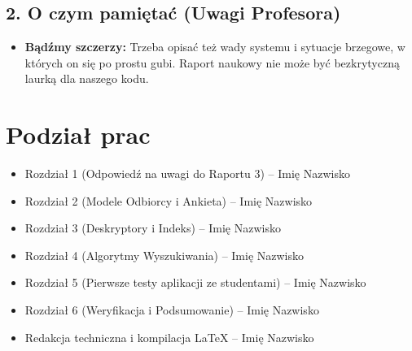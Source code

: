 \documentclass[14pt,a4paper]{extarticle}
\begin{document}
\subsection*{2. O czym pamiętać (Uwagi Profesora)}
\begin{itemize}
    \item \textbf{Bądźmy szczerzy:} Trzeba opisać też wady systemu i sytuacje brzegowe, w których on się po prostu gubi. Raport naukowy nie może być bezkrytyczną laurką dla naszego kodu.
\end{itemize}

\section*{Podział prac}
\begin{itemize}
    \item Rozdział 1 (Odpowiedź na uwagi do Raportu 3) -- Imię Nazwisko
    \item Rozdział 2 (Modele Odbiorcy i Ankieta) -- Imię Nazwisko
    \item Rozdział 3 (Deskryptory i Indeks) -- Imię Nazwisko
    \item Rozdział 4 (Algorytmy Wyszukiwania) -- Imię Nazwisko
    \item Rozdział 5 (Pierwsze testy aplikacji ze studentami) -- Imię Nazwisko
    \item Rozdział 6 (Weryfikacja i Podsumowanie) -- Imię Nazwisko
    \item Redakcja techniczna i kompilacja LaTeX -- Imię Nazwisko
\end{itemize}
\end{document}
